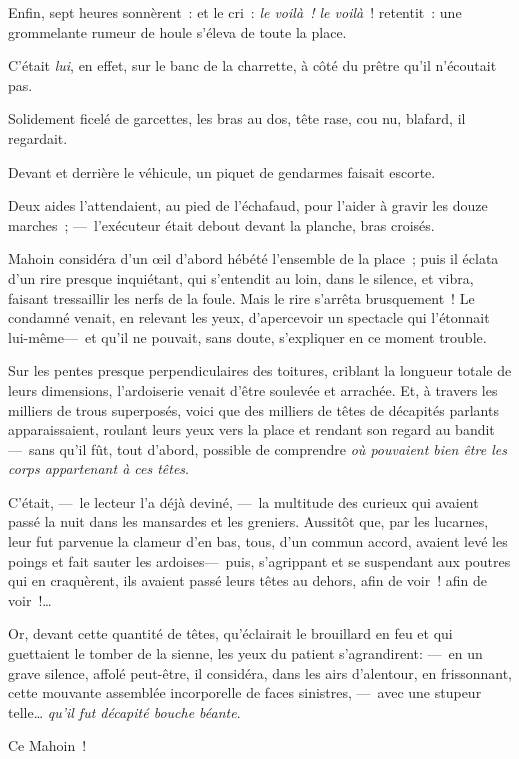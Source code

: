 \documentclass[french,twoside]{book} %
\begin{document}
Enfin, sept heures sonnèrent : et le cri : \emph{le voilà ! le voilà} ! retentit : une grommelante rumeur de houle s’éleva de toute la place.\par
C’était \emph{lui}, en effet, sur le banc de la charrette, à côté du prêtre qu’il n’écoutait pas.\par
Solidement ficelé de garcettes, les bras au dos, tête rase, cou nu, blafard, il regardait.\par
Devant et derrière le véhicule, un piquet de gendarmes faisait escorte.\par
   Deux aides l’attendaient, au pied de l’échafaud, pour l’aider à gravir les douze marches ; — l’exécuteur était debout devant la planche, bras croisés.\par
Mahoin considéra d’un œil d’abord hébété l’ensemble de la place ; puis il éclata d’un rire presque inquiétant, qui s’entendit au loin, dans le silence, et vibra, faisant tressaillir les nerfs de la foule. Mais le rire s’arrêta brusquement ! Le condamné venait, en relevant les yeux, d’apercevoir un spectacle qui l’étonnait lui-même— et qu’il ne pouvait, sans doute, s’expliquer en ce moment trouble.\par
Sur les pentes presque perpendiculaires des toitures, criblant la longueur totale de leurs dimensions, l’ardoiserie venait d’être soulevée et arrachée. Et, à travers les milliers de trous superposés, voici que des milliers de têtes de décapités parlants apparaissaient, roulant leurs yeux vers la place et rendant son regard au bandit— sans qu’il fût, tout d’abord, possible de comprendre \emph{où pouvaient bien être les corps appartenant à ces têtes}.\par
   C’était, — le lecteur l’a déjà deviné, — la multitude des curieux qui avaient passé la nuit dans les mansardes et les greniers. Aussitôt que, par les lucarnes, leur fut parvenue la clameur d’en bas, tous, d’un commun accord, avaient levé les poings et fait sauter les ardoises— puis, s’agrippant et se suspendant aux poutres qui en craquèrent, ils avaient passé leurs têtes au dehors, afin de voir ! afin de voir !…\par
Or, devant cette quantité de têtes, qu’éclairait le brouillard en feu et qui guettaient le tomber de la sienne, les yeux du patient s’agrandirent: — en un grave silence, affolé peut-être, il considéra, dans les airs d’alentour, en frissonnant, cette mouvante assemblée incorporelle de faces sinistres, — avec une stupeur telle… \emph{qu’il fut décapité bouche béante}.\par
Ce Mahoin !
\end{document}
